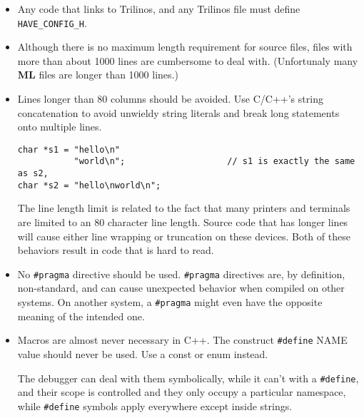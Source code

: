 \documentclass[10pt,letter,relax]{SANDreport}
\newcommand{\ML}     {{\bf ML }}
\begin{document}
\begin{itemize}
\item Any code that links to Trilinos, and any Trilinos file must define
  \verb!HAVE_CONFIG_H!.
\item Although there is no maximum length requirement for source files,
  files with more than about 1000 lines are cumbersome to deal
  with. (Unfortunaly many \ML files are longer than 1000 lines.)
\item Lines longer than 80 columns should be avoided. Use C/C++'s string
  concatenation to avoid unwieldy string literals and break long
  statements onto multiple lines. 
\begin{verbatim}
char *s1 = "hello\n"
           "world\n";                    // s1 is exactly the same as s2,
char *s2 = "hello\nworld\n";
\end{verbatim}
The line length limit is related to the fact that many printers and
terminals are limited to an 80 character line length. Source code that
has longer lines will cause either line wrapping or truncation on these
devices. Both of these behaviors result in code that is hard to read.
\item No \verb!#pragma! directive should be used. \verb!#pragma!
  directives are, by definition, non-standard, and can cause unexpected
  behavior when compiled on other systems. On another system, a \verb!#pragma!
  might even have the opposite meaning of the intended one.
\item Macros are almost never necessary in C++.  The construct \verb!#define!
  NAME value should never be used. Use a const or enum instead.
  
  The debugger can deal with them symbolically, while it can't with a
  \verb!#define!, and their scope is controlled and they only occupy a
  particular namespace, while \verb!#define! symbols apply everywhere except
  inside strings.
  

\end{itemize}
\end{document}
